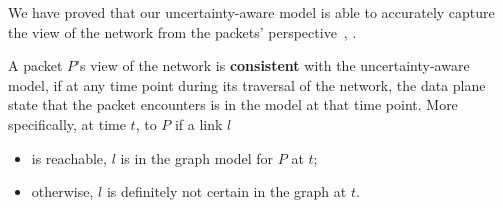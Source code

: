 We have proved that our uncertainty-aware model is able to accurately 
capture the view of the network from the packets' perspective~\cite{gcc_tr},
.
  \vspace{-0.1in}
\begin{definition} A packet $P$'s view of the network is {\bf consistent} with
the uncertainty-aware model, if at any time point during its traversal of the
network, the data plane state that the packet encounters is in the model at
that time point. More specifically, at time $t$, to $P$ if a link $l$
\begin{itemize}[noitemsep,topsep=0pt,leftmargin=*] 
\item is reachable, $l$ is in the graph model for $P$ at $t$;
\item otherwise, $l$ is definitely not certain in the graph at $t$.
\end{itemize} \end{definition}
  \vspace{-0.1in}

